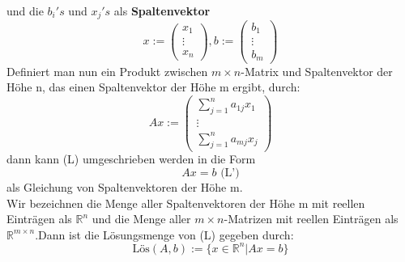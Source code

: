\documentclass{scrbook}
\begin{document}
und die \(b_{i}'s\) und \(x_j's\) als \textbf{Spaltenvektor}
\[
x:=\left(\begin{array}{c}
x_1\\
\vdots\\
x_n
\end{array}\right), b:= \left(
\begin{array}{c}
b_1\\
\vdots\\
b_m
\end{array}\right)
\]
Definiert man nun ein Produkt zwischen \(m\times n\)-Matrix und Spaltenvektor der Höhe n, das einen Spaltenvektor der Höhe m ergibt, durch:
\[
Ax := \left(\begin{array}{c}
\sum^n_{j=1}a_{1j}x_1\\
\vdots\\
\sum^n_{j=1}a_{mj}x_j
\end{array}\right)
\]
dann kann (L) umgeschrieben werden in die Form
\[Ax=b \text{ (L'})\]
als Gleichung von Spaltenvektoren der Höhe m.\\
Wir bezeichnen die Menge aller Spaltenvektoren der Höhe m mit reellen Einträgen als \(\mathbb{R}^n\) und die Menge aller \(m \times n\)-Matrizen mit reellen Einträgen als \(\mathbb{R}^{m \times n}\).Dann ist die Lösungsmenge von (L) gegeben durch:
\[\text{Lös}(A,b):=\{x \in \mathbb{R}^n| Ax=b\}\]
\end{document}
